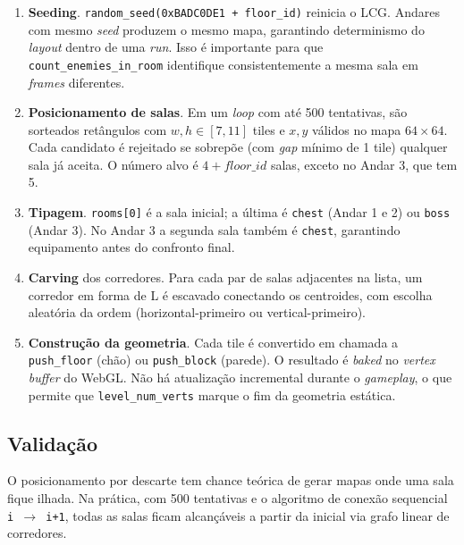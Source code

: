 \begin{enumerate}
  \item \textbf{Seeding}. \texttt{random\_seed(0xBADC0DE1 + floor\_id)} reinicia o LCG.
    Andares com mesmo \emph{seed} produzem o mesmo mapa, garantindo determinismo do
    \emph{layout} dentro de uma \emph{run}. Isso é importante para que
    \texttt{count\_enemies\_in\_room} identifique consistentemente a mesma sala em
    \emph{frames} diferentes.

  \item \textbf{Posicionamento de salas}. Em um \emph{loop} com até 500 tentativas,
    são sorteados retângulos com $w, h \in [7, 11]$ tiles e $x, y$ válidos no mapa
    $64 \times 64$. Cada candidato é rejeitado se sobrepõe (com \emph{gap} mínimo de
    1 tile) qualquer sala já aceita. O número alvo é $4 + \mathit{floor\_id}$ salas,
    exceto no Andar 3, que tem 5.

  \item \textbf{Tipagem}. \texttt{rooms[0]} é a sala inicial; a última é
    \texttt{chest} (Andar 1 e 2) ou \texttt{boss} (Andar 3). No Andar 3 a segunda
    sala também é \texttt{chest}, garantindo equipamento antes do confronto final.

  \item \textbf{Carving} dos corredores. Para cada par de salas adjacentes na lista,
    um corredor em forma de L é escavado conectando os centroides, com escolha
    aleatória da ordem (horizontal-primeiro ou vertical-primeiro).

  \item \textbf{Construção da geometria}. Cada tile é convertido em chamada a
    \texttt{push\_floor} (chão) ou \texttt{push\_block} (parede). O resultado é
    \emph{baked} no \emph{vertex buffer} do WebGL. Não há atualização incremental
    durante o \emph{gameplay}, o que permite que \texttt{level\_num\_verts} marque
    o fim da geometria estática.
\end{enumerate}

\subsection{Validação}

O posicionamento por descarte tem chance teórica de gerar mapas onde uma sala fique
ilhada. Na prática, com 500 tentativas e o algoritmo de conexão sequencial
\texttt{i $\to$ i+1}, todas as salas ficam alcançáveis a partir da inicial via grafo
linear de corredores.

